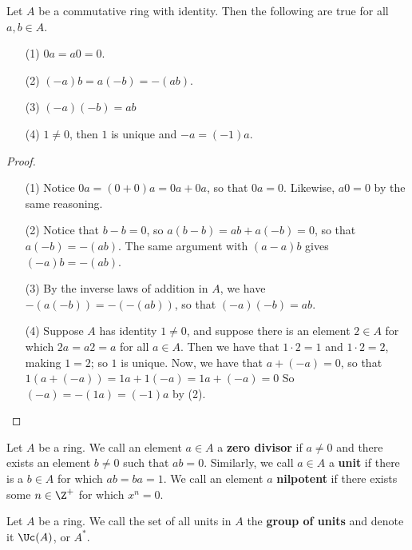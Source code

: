 \begin{lemma}\label{1.1.1}
    Let $A$ be a commutative ring with identity. Then the following are true for
    all $a,b \in A$.
    \begin{enumerate}
        \item[(1)] $0a=a0=0$.

        \item[(2)] $(-a)b=a(-b)=-(ab)$.

        \item[(3)] $(-a)(-b)=ab$

        \item[(4)] $1 \neq 0$, then $1$ is unique and $-a=(-1)a$.
    \end{enumerate}
\end{lemma}
\begin{proof}
    \begin{enumerate}
        \item[(1)] Notice $0a=(0+0)a=0a+0a$, so that $0a=0$. Likewise, $a0=0$ by
            the same reasoning.

        \item[(2)] Notice that $b-b=0$, so $a(b-b)=ab+a(-b)=0$, so that
            $a(-b)=-(ab)$. The same argument with $(a-a)b$ gives $(-a)b=-(ab)$.

        \item[(3)] By the inverse laws of addition in $A$, we have
            $-(a(-b))=-(-(ab))$, so that $(-a)(-b)=ab$.

    \item[(4)] Suppose $A$ has identity $1 \neq 0$, and suppose there is an
        element $2 \in A$ for which  $2a=a2=a$ for all $a \in A$. Then we have
        that $1 \cdot 2=1$ and  $1 \cdot 2=2$, making  $1=2$; so  $1$ is unique.
        Now, we have that $a+(-a)=0$, so that $1(a+(-a))=1a+1(-a)=1a+(-a)=0$ So
        $(-a)=-(1a)=(-1)a$ by (2).
    \end{enumerate}
\end{proof}

\begin{definition}
    Let $A$ be a ring. We call an element  $a \in A$ a  \textbf{zero divisor} if
    $a \neq 0$ and there exists an element  $b \neq 0$ such that  $ab=0$.
    Similarly, we call $a \in A$ a \textbf{unit} if there is a $b \in A$ for
    which  $ab=ba=1$. We call an element $a$  \textbf{nilpotent} if there exists
    some $n \in \Z^+$ for which $x^n=0$.
\end{definition}

\begin{definition}
    Let $A$ be a ring. We call the set of all units in  $A$ the \textbf{group
    of units} and denote it $\Uc(A)$, or $A^\ast$.
\end{definition}

